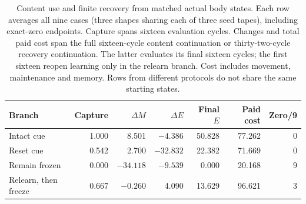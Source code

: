 \begin{table}[htbp]
\centering\small
\caption{Content use and finite recovery from matched actual body states. Each row averages all nine cases (three shapes sharing each of three seed tapes), including exact-zero endpoints. Capture spans sixteen evaluation cycles. Changes and total paid cost span the full sixteen-cycle content continuation or thirty-two-cycle recovery continuation. The latter evaluates its final sixteen cycles; the first sixteen reopen learning only in the relearn branch. Cost includes movement, maintenance and memory. Rows from different protocols do not share the same starting states.}
\label{tab:ecology-continuations}
\begin{tabular}{lrrrrrr}
\toprule
Branch & Capture & $\Delta M$ & $\Delta E$ & Final $E$ & Paid cost & Zero/9\\
\midrule
Intact cue & 1.000 & 8.501 & $-4.386$ & 50.828 & 77.262 & 0\\
Reset cue & 0.542 & 2.700 & $-32.832$ & 22.382 & 71.669 & 0\\
\midrule
Remain frozen & 0.000 & $-34.118$ & $-9.539$ & 0.000 & 20.168 & 9\\
Relearn, then freeze & 0.667 & $-0.260$ & 4.090 & 13.629 & 96.621 & 3\\
\bottomrule
\end{tabular}
\end{table}

